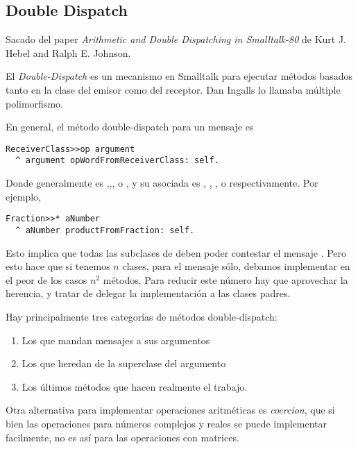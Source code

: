 \subsection{Double Dispatch}

Sacado del paper \emph{Arithmetic and Double Dispatching in Smalltalk-80} de Kurt J. Hebel and Ralph E. Johnson. 

El \emph{Double-Dispatch} es un mecanismo en Smalltalk para ejecutar m\'etodos basados tanto en la clase del emisor como del receptor. Dan Ingalls lo llamaba m\'ultiple polimorfismo. 

En general, el m\'etodo double-dispatch para un mensaje  es

\begin{verbatim}
ReceiverClass>>op argument
  ^ argument opWordFromReceiverClass: self.
\end{verbatim}

Donde  generalmente es \code{+},\code{-},\code{*},\code{/} o \code{=}, y su  asociada es , , ,  o  respectivamente. Por ejemplo, 

\begin{verbatim}
Fraction>>* aNumber
  ^ aNumber productFromFraction: self.
\end{verbatim}

Esto implica que todas las subclases de  deben poder contestar el mensaje . Pero esto hace que si tenemos $n$ clases, para el mensaje \code{*} s\'olo, debamos implementar en el peor de los casos $n^2$ m\'etodos. Para reducir este n\'umero hay que aprovechar la herencia, y tratar de delegar la implementaci\'on a las clases padres. 

Hay principalmente tres categor\'ias de m\'etodos double-dispatch:

\begin{enumerate}
 \item Los que mandan mensajes a sus argumentos
 \item Los que heredan de la superclase del argumento
 \item Los \'ultimos m\'etodos que hacen realmente el trabajo. 
\end{enumerate}

Otra alternativa para implementar operaciones aritm\'eticas es \emph{coercion}, que si bien las operaciones para n\'umeros complejos y reales se puede implementar facilmente, no es as\'i para las operaciones con matrices. 